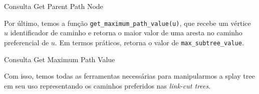 \begin{algorithm}[h!]
    \caption{Consulta Get Parent Path Node}\label{splay:get-parent-path}
    \begin{algorithmic}[1]
        \State {}
        \EndFunction
    \end{algorithmic}
\end{algorithm}

Por último, temos a função \texttt{get\_maximum\_path\_value(u)}, que recebe um vértice $u$ identificador de caminho e retorna o maior valor de uma aresta no caminho preferencial de $u$. Em termos práticos, retorna o valor de \texttt{max\_subtree\_value}.

\begin{algorithm}[h!]
    \caption{Consulta Get Maximum Path Value}\label{splay:get-maximum-value}
    \begin{algorithmic}[1]
        \State {}
        \EndFunction
    \end{algorithmic}
\end{algorithm}

Com isso, temos todas as ferramentas necessárias para manipularmos a splay tree em seu uso representando os caminhos preferidos nas \emph{link-cut trees}.